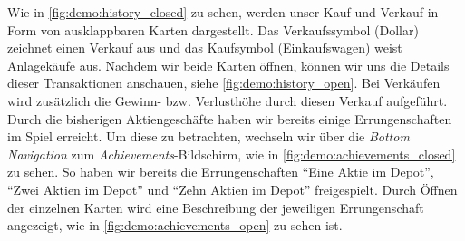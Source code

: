 \documentclass[a4paper]{article}
\begin{document}
Wie in \autoref{fig:demo:history_closed} zu sehen, werden unser Kauf und Verkauf in Form von ausklappbaren Karten dargestellt.
Das Verkaufssymbol (Dollar) zeichnet einen Verkauf aus und das Kaufsymbol (Einkaufswagen) weist Anlagekäufe aus.
Nachdem wir beide Karten öffnen, können wir uns die Details dieser Transaktionen anschauen, siehe \autoref{fig:demo:history_open}.
Bei Verkäufen wird zusätzlich die Gewinn- bzw. Verlusthöhe durch diesen Verkauf aufgeführt.\newline
Durch die bisherigen Aktiengeschäfte haben wir bereits einige Errungenschaften im Spiel erreicht.
Um diese zu betrachten, wechseln wir über die \textit{Bottom Navigation} zum \textit{Achievements}-Bildschirm, wie in \autoref{fig:demo:achievements_closed} zu sehen.
So haben wir bereits die Errungenschaften "`Eine Aktie im Depot"', "`Zwei Aktien im Depot"' und "`Zehn Aktien im Depot"' freigespielt.
Durch Öffnen der einzelnen Karten wird eine Beschreibung der jeweiligen Errungenschaft angezeigt, wie in  \autoref{fig:demo:achievements_open} zu sehen ist.
\end{document}
